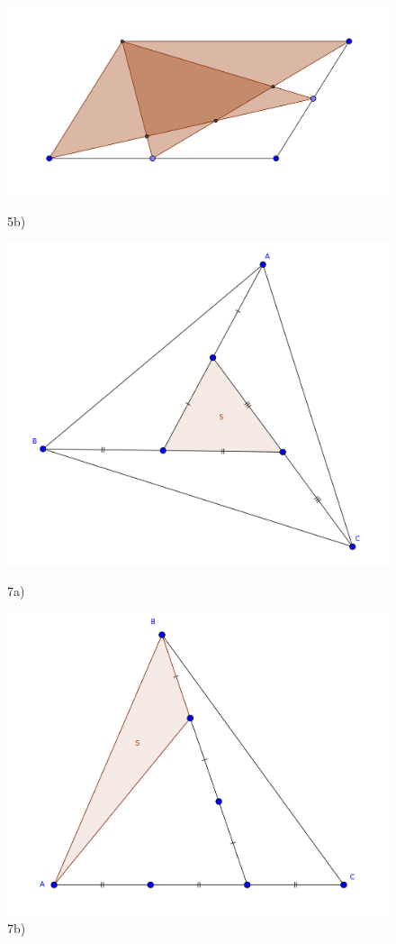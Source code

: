 \begin{figure}[!h]
\includegraphics[width=1.2\linewidth]{2c}
\caption{5b)}
\endminipage\hfill
{}
\includegraphics[width=1.2\linewidth]{7a}
\caption{7a)}
\endminipage\hfill
{}
\includegraphics[width=1.2\linewidth]{7b}
\caption{7b)}
\endminipage
\end{figure}

